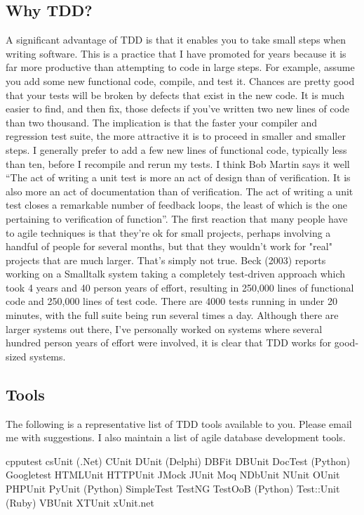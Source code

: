 \subsection{Why TDD?}
A significant advantage of TDD is that it enables you to take small steps when writing software. This is a practice that I have promoted for years because it is far more productive than attempting to code in large steps. For example, assume you add some new functional code, compile, and test it.  Chances are pretty good that your tests will be broken by defects that exist in the new code. It is much easier to find, and then fix, those defects if you've written two new lines of code than two thousand. The implication is that the faster your compiler and regression test suite, the more attractive it is to proceed in smaller and smaller steps. I generally prefer to add a few new lines of functional code, typically less than ten, before I recompile and rerun my tests.
I think Bob Martin says it well “The act of writing a unit test is more an act of design than of verification.  It is also more an act of documentation than of verification.  The act of writing a unit test closes a remarkable number of feedback loops, the least of which is the one pertaining to verification of function”.
The first reaction that many people have to agile techniques is that they're ok for small projects, perhaps involving a handful of people for several months, but that they wouldn't work for "real" projects that are much larger.  That’s simply not true. Beck (2003) reports working on a Smalltalk system taking a completely test-driven approach which took 4 years and 40 person years of effort, resulting in 250,000 lines of functional code and 250,000 lines of test code.  There are 4000 tests running in under 20 minutes, with the full suite being run several times a day. Although there are larger systems out there, I've personally worked on systems where several hundred person years of effort were involved, it is clear that TDD works for good-sized systems.
\subsection{Tools}
The following is a representative list of TDD tools available to you.  Please email me with suggestions. I also maintain a list of agile database development tools.

cpputest
csUnit (.Net)
CUnit
DUnit (Delphi)
DBFit
DBUnit
DocTest (Python)
Googletest
HTMLUnit
HTTPUnit
JMock
JUnit
Moq
NDbUnit
NUnit
OUnit
PHPUnit
PyUnit (Python)
SimpleTest
TestNG
TestOoB (Python)
Test::Unit (Ruby)
VBUnit
XTUnit
xUnit.net